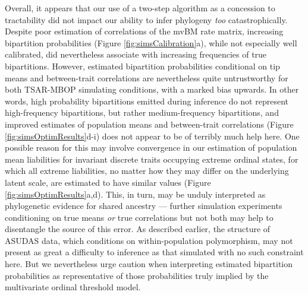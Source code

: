 Overall, it appears that our use of a two-step algorithm as a concession to tractability did not impact our ability to infer phylogeny \textit{too} catastrophically. Despite poor estimation of correlations of the mvBM rate matrix, increasing bipartition probabilities (Figure \ref{fig:simsCalibration}a), while not especially well calibrated, did nevertheless associate with increasing frequencies of true bipartitions. However, estimated bipartition probabilities conditional on tip means and between-trait correlations are nevertheless quite untrustworthy for both TSAR-MBOP simulating conditions, with a marked bias upwards. In other words, high probability bipartitions emitted during inference do not represent high-frequency bipartitions, but rather medium-frequency bipartitions, and improved estimates of population means and between-trait correlations (Figure \ref{fig:simsOptimResults}d-i) does not appear to be of terribly much help here. One possible reason for this may involve convergence in our estimation of population mean liabilities for invariant discrete traits occupying extreme ordinal states, for which all extreme liabilities, no matter how they may differ on the underlying latent scale, are estimated to have similar values (Figure \ref{fig:simsOptimResults}a,d). This, in turn, may be unduly interpreted as phylogenetic evidence for shared ancestry --- further simulation experiments conditioning on true means \textit{or} true correlations but not both may help to disentangle the source of this error. As described earlier, the structure of ASUDAS data, which conditions on within-population polymorphism, may not present as great a difficulty to inference as that simulated with no such constraint here. But we nevertheless urge caution when interpreting estimated bipartition probabilities as representative of those probabilities truly implied by the multivariate ordinal threshold model.

